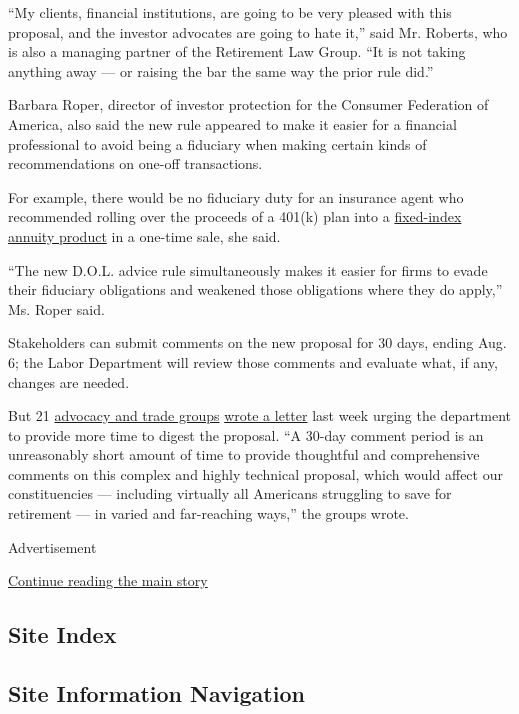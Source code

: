 ``My clients, financial institutions, are going to be very pleased with
this proposal, and the investor advocates are going to hate it,'' said
Mr. Roberts, who is also a managing partner of the Retirement Law Group.
``It is not taking anything away --- or raising the bar the same way the
prior rule did.''

Barbara Roper, director of investor protection for the Consumer
Federation of America, also said the new rule appeared to make it easier
for a financial professional to avoid being a fiduciary when making
certain kinds of recommendations on one-off transactions.

For example, there would be no fiduciary duty for an insurance agent who
recommended rolling over the proceeds of a 401(k) plan into a
\href{https://www.nytimes3xbfgragh.onion/2020/03/13/business/coronavirus-scams.html}{fixed-index
annuity product} in a one-time sale, she said.

``The new D.O.L. advice rule simultaneously makes it easier for firms to
evade their fiduciary obligations and weakened those obligations where
they do apply,'' Ms. Roper said.

Stakeholders can submit comments on the new proposal for 30 days, ending
Aug. 6; the Labor Department will review those comments and evaluate
what, if any, changes are needed.

But 21
\href{https://consumerfed.org/testimonial/dol-urged-to-provide-opportunity-for-comment-on-anti-investor-rule/}{advocacy
and trade groups}
\href{https://consumerfed.org/wp-content/uploads/2020/07/DOL-Advice-Rule-Extension-Request.pdf}{wrote
a letter} last week urging the department to provide more time to digest
the proposal. ``A 30-day comment period is an unreasonably short amount
of time to provide thoughtful and comprehensive comments on this complex
and highly technical proposal, which would affect our constituencies ---
including virtually all Americans struggling to save for retirement ---
in varied and far-reaching ways,'' the groups wrote.

Advertisement

\protect\hyperlink{after-bottom}{Continue reading the main story}

\hypertarget{site-index}{%
\subsection{Site Index}\label{site-index}}

\hypertarget{site-information-navigation}{%
\subsection{Site Information
Navigation}\label{site-information-navigation}}

